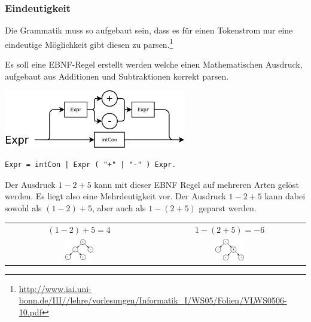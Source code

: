 \newpage

\subsubsection{Eindeutigkeit}

Die Grammatik muss so aufgebaut sein, dass es für einen Tokenstrom nur eine eindeutige Möglichkeit gibt diesen zu parsen.\footnote{\url{http://www.iai.uni-bonn.de/III//lehre/vorlesungen/Informatik_I/WS05/Folien/VLWS0506-10.pdf}}


Es soll eine EBNF-Regel erstellt werden welche einen Mathematischen Ausdruck, aufgebaut aus Additionen und Subtraktionen korrekt parsen.

\includegraphics[width=0.6\textwidth]{./media/images/compiler/ambiguity_wrong.png}

\begin{lstlisting}[language=EBNF]
Expr = intCon | Expr ( "+" | "-" ) Expr.
\end{lstlisting}

Der Ausdruck $1-2+5$ kann mit dieser EBNF Regel auf mehreren Arten gelöst werden. Es liegt also eine Mehrdeutigkeit vor. Der Ausdruck $1-2+5$ kann dabei sowohl als $(1-2)+5$, aber auch als $1-(2+5)$ geparst werden.

\begin{tabular}{ c | c }
  $(1-2)+5=4$ & 
  $1-(2+5)=-6$ \\
  \includegraphics[width=0.2\textwidth]{./media/images/compiler/ambiguity_tree_correct.png} & 
  \includegraphics[width=0.2\textwidth]{./media/images/compiler/ambiguity_tree_wrong.png} \\
\end{tabular}

